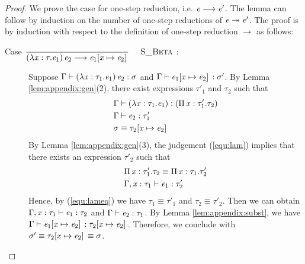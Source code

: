 \begin{proof}
    We prove the case for one-step reduction, i.e. $\mathit{e}  \longrightarrow  \mathit{e'}$. The lemma can follow by induction on the number of one-step reductions of $\mathit{e}  \twoheadrightarrow  \mathit{e'}$.
    The proof is by induction with respect to the definition of one-step reduction $ \longrightarrow $ as follows:
    \begin{description}
        \item[Case ${\displaystyle\frac{\begin{array}{l} \end{array}}{ ( \lambda \mathit{x} : \tau . \mathit{e_{{\mathrm{1}}}} ) \, \mathit{e_{{\mathrm{2}}}} \longrightarrow \mathit{e_{{\mathrm{1}}}} [ \mathit{x} \mapsto \mathit{e_{{\mathrm{2}}}} ] \,}\quad\textsc{ {\textsc{S\_Beta}}{} }}$:] $\quad$ \\
        Suppose $\Gamma  \vdash  (  \lambda  \mathit{x}  :  \tau_{{\mathrm{1}}}  .  \mathit{e_{{\mathrm{1}}}}  ) \, \mathit{e_{{\mathrm{2}}}}  :  \sigma$ and $\Gamma  \vdash  \mathit{e_{{\mathrm{1}}}}  [  \mathit{x}  \mapsto  \mathit{e_{{\mathrm{2}}}}  ] \,  :  \sigma'$. By Lemma \ref{lem:appendix:gen}(2), there exist expressions $\tau'_{{\mathrm{1}}}$ and $\tau_{{\mathrm{2}}}$ such that 
        \begin{align}
            &\Gamma  \vdash  (  \lambda  \mathit{x}  :  \tau_{{\mathrm{1}}}  .  \mathit{e_{{\mathrm{1}}}}  )  :  (  \Pi \, \mathit{x}  :  \tau'_{{\mathrm{1}}}  .  \tau_{{\mathrm{2}}}  ) \label{equ:lam} \\
            &\Gamma  \vdash  \mathit{e_{{\mathrm{2}}}}  :  \tau'_{{\mathrm{1}}} \nonumber \\
            &\sigma  \equiv  \tau_{{\mathrm{2}}}  [  \mathit{x}  \mapsto  \mathit{e_{{\mathrm{2}}}}  ] \, \nonumber
        \end{align}
        By Lemma \ref{lem:appendix:gen}(3), the judgement (\ref{equ:lam}) implies that there exists an expression $\tau'_{{\mathrm{2}}}$ such that
        \begin{align}
            &\Pi \, \mathit{x}  :  \tau'_{{\mathrm{1}}}  .  \tau_{{\mathrm{2}}}  \equiv  \Pi \, \mathit{x}  :  \tau_{{\mathrm{1}}}  .  \tau'_{{\mathrm{2}}} \label{equ:lameq}\\
            &\Gamma  ,  \mathit{x}  :  \tau_{{\mathrm{1}}}  \vdash  \mathit{e_{{\mathrm{1}}}}  :  \tau'_{{\mathrm{2}}} \nonumber
        \end{align}
        Hence, by (\ref{equ:lameq}) we have $\tau_{{\mathrm{1}}}  \equiv  \tau'_{{\mathrm{1}}}$ and $\tau_{{\mathrm{2}}}  \equiv  \tau'_{{\mathrm{2}}}$. Then we can obtain $\Gamma  ,  \mathit{x}  :  \tau_{{\mathrm{1}}}  \vdash  \mathit{e_{{\mathrm{1}}}}  :  \tau_{{\mathrm{2}}}$ and $\Gamma  \vdash  \mathit{e_{{\mathrm{2}}}}  :  \tau_{{\mathrm{1}}}$. By Lemma \ref{lem:appendix:subst}, we have $\Gamma  \vdash  \mathit{e_{{\mathrm{1}}}}  [  \mathit{x}  \mapsto  \mathit{e_{{\mathrm{2}}}}  ] \,  :  \tau_{{\mathrm{2}}}  [  \mathit{x}  \mapsto  \mathit{e_{{\mathrm{2}}}}  ] \,$. Therefore, we conclude with $\sigma'  \equiv  \tau_{{\mathrm{2}}}  [  \mathit{x}  \mapsto  \mathit{e_{{\mathrm{2}}}}  ] \,  \equiv  \sigma$.
        

\end{description}
\end{proof}
